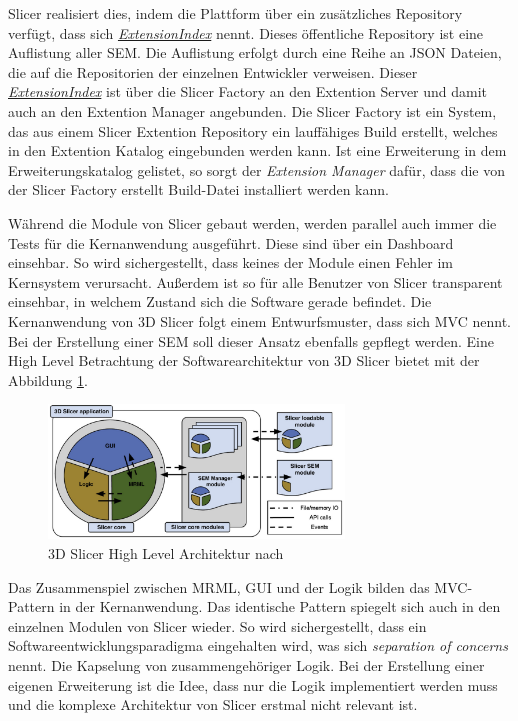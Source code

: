 Slicer realisiert dies, indem die Plattform über ein zusätzliches Repository verfügt,
dass sich
\href{https://github.com/Slicer/ExtensionsIndex?tab=readme-ov-file}{\textit{ExtensionIndex}}
nennt. Dieses öffentliche Repository ist eine Auflistung aller \ac{SEM}. Die Auflistung
erfolgt durch eine Reihe an \ac{JSON} Dateien, die auf die Repositorien der einzelnen
Entwickler verweisen. Dieser
\href{https://github.com/Slicer/ExtensionsIndex?tab=readme-ov-file}{\textit{ExtensionIndex}}
ist über die Slicer Factory an den Extention Server und damit auch an den
Extention Manager angebunden. Die Slicer Factory ist ein System, das aus einem
Slicer Extention Repository ein lauffähiges Build erstellt, welches in den Extention
Katalog eingebunden werden kann. Ist eine Erweiterung in dem Erweiterungskatalog
gelistet, so sorgt der \textit{Extension Manager} dafür, dass die von der Slicer
Factory erstellt Build-Datei installiert werden kann.

Während die Module von Slicer gebaut werden, werden parallel auch immer die
Tests für die Kernanwendung ausgeführt. Diese sind über ein Dashboard einsehbar.
So wird sichergestellt, dass keines der Module einen Fehler im Kernsystem verursacht.
Außerdem ist so für alle Benutzer von Slicer transparent einsehbar, in welchem Zustand
sich die Software gerade befindet. Die Kernanwendung von 3D Slicer folgt einem
Entwurfsmuster, dass sich \ac{MVC} nennt. Bei der Erstellung einer \ac{SEM} soll
dieser Ansatz ebenfalls gepflegt werden. Eine High Level Betrachtung der Softwarearchitektur
von 3D Slicer bietet \cite[S.~1332]{fedorov2012slicer} mit der Abbildung \ref{fig:3d_slicer_architektur}.

\begin{figure}[h]
	\centering
	\includegraphics[width=0.7\textwidth]{img/3d_slicer_architektur.jpg}
	\caption{3D Slicer High Level Architektur nach \citet[S.~1332]{fedorov2012slicer}}
	\label{fig:3d_slicer_architektur}
\end{figure}

Das Zusammenspiel zwischen \ac{MRML}, \ac{GUI} und der Logik bilden das MVC-Pattern
in der Kernanwendung. Das identische Pattern spiegelt sich auch in den einzelnen
Modulen von Slicer wieder. So wird sichergestellt, dass ein
Softwareentwicklungsparadigma eingehalten wird, was sich \textit{separation of
concerns} nennt. Die Kapselung von zusammengehöriger Logik. Bei der Erstellung
einer eigenen Erweiterung ist die Idee, dass nur die Logik implementiert werden muss
und die komplexe Architektur von Slicer erstmal nicht relevant ist.

